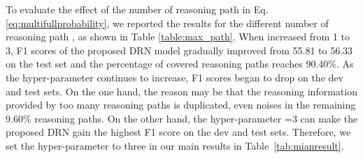 \documentclass[11pt,a4paper]{article}
\begin{document}
\label{sec4-4}
\begin{table}[h]
\centering
{}
\caption{The effect of the number of reasoning paths  for the proposed DRN model.}
\label{table:max_path} 
\end{table}
To evaluate the effect of the number of reasoning path  in Eq.\ref{eq:multifullprobability}, we reported the results for the different number of reasoning path , as shown in Table \ref{table:max_path}.
When  increased from 1 to 3, F1 scores of the proposed DRN model gradually improved from 55.81 to 56.33 on the test set and the percentage of covered reasoning paths reaches 90.40\%.
As the hyper-parameter  continues to increase, F1 scores began to drop on the dev and test sets.
On the one hand, the reason may be that the reasoning information provided by too many reasoning paths is duplicated, even noises in the remaining 9.60\% reasoning paths.
On the other hand, the hyper-parameter =3 can make the proposed DRN gain the highest F1 score on the dev and test sets.
Therefore, we set the hyper-parameter  to three in our main results in Table~\ref{tab:mianresult}.
\end{document}
